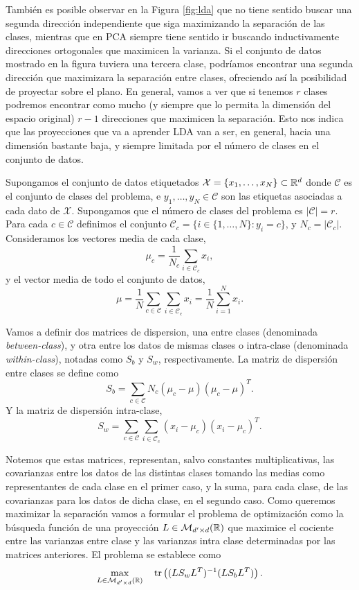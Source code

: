 También es posible observar en la Figura \ref{fig:lda} que no tiene sentido buscar una segunda dirección independiente que siga maximizando la separación de las clases, mientras que en PCA siempre tiene sentido ir buscando inductivamente direcciones ortogonales que maximicen la varianza. Si el conjunto de datos mostrado en la figura tuviera una tercera clase, podríamos encontrar una segunda dirección que maximizara la separación entre clases, ofreciendo así la posibilidad de proyectar sobre el plano. En general, vamos a ver que si tenemos $r$ clases podremos encontrar como mucho (y siempre que lo permita la dimensión del espacio original) $r-1$ direcciones que maximicen la separación. Esto nos indica que las proyecciones que va a aprender LDA van a ser, en general, hacia una dimensión bastante baja, y siempre limitada por el número de clases en el conjunto de datos.

Supongamos el conjunto de datos etiquetados $\mathcal{X} = \{x_1,\dots,x_N\} \subset \mathbb{R}^d$ donde $\mathcal{C}$ es el conjunto de clases del problema, e $y_1,\dots,y_N \in \mathcal{C}$ son las etiquetas asociadas a cada dato de $\mathcal{X}$. Supongamos que el número de clases del problema es $|\mathcal{C}| = r$. Para cada $c \in \mathcal{C}$ definimos el conjunto $\mathcal{C}_c = \{ i \in \{1,\dots,N\} \colon y_i = c \}$, y $N_c = |\mathcal{C}_c|$. Consideramos los vectores media de cada clase,
\[\mu_c = \frac{1}{N_c} \sum_{i \in \mathcal{C}_c} x_i,\]
y el vector media de todo el conjunto de datos,
\[\mu = \frac{1}{N}\sum_{c \in \mathcal{C}}\sum_{i \in \mathcal{C}_c}x_i = \frac{1}{N}\sum_{i=1}^N x_i. \]

Vamos a definir dos matrices de dispersion, una entre clases (denominada \emph{between-class}), y otra entre los datos de mismas clases o intra-clase (denominada \emph{within-class}), notadas como $S_b$ y $S_w$, respectivamente. La matriz de dispersión entre clases se define como
\begin{equation}
    S_b = \sum_{c \in \mathcal{C}} N_c(\mu_c - \mu)(\mu_c - \mu)^T.
\end{equation}
Y la matriz de dispersión intra-clase,
\begin{equation}
    S_w = \sum_{c \in \mathcal{C}} \sum_{i \in \mathcal{C}_c}(x_i- \mu_c)(x_i - \mu_c)^T.
\end{equation}  

Notemos que estas matrices, representan, salvo constantes multiplicativas, las covarianzas entre los datos de las distintas clases tomando las medias como representantes de cada clase en el primer caso, y la suma, para cada clase, de las covarianzas para los datos de dicha clase, en el segundo caso. Como queremos maximizar la separación vamos a formular el problema de optimización como la búsqueda función de una proyección $L \in \mathcal{M}_{d'\times d}(\mathbb{R})$ que maximice el cociente entre las varianzas entre clase y las varianzas intra clase determinadas por las matrices anteriores. El problema se establece como
\begin{equation} \label{eq:lda}
    \max_{\substack{L \in \mathcal{M}_{d'\times d}(\mathbb{R}) }} \quad \operatorname{tr}\left((LS_wL^T)^{-1}(L S_b L^T)\right).
\end{equation}


